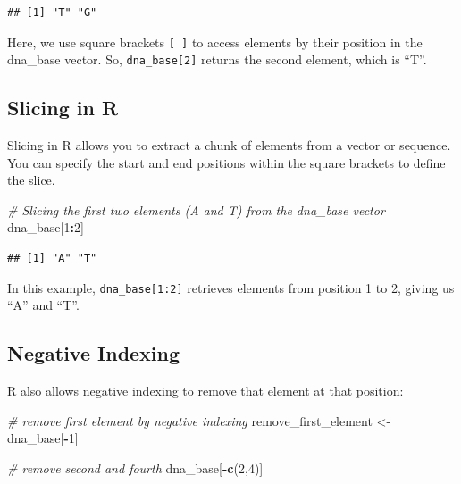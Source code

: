 \documentclass[
]{book}
\newenvironment{Shaded}{\begin{snugshade}}{\end{snugshade}}
\newcommand{\CommentTok}[1]{\textcolor[rgb]{0.56,0.35,0.01}{\textit{#1}}}
\newcommand{\DecValTok}[1]{\textcolor[rgb]{0.00,0.00,0.81}{#1}}
\newcommand{\FunctionTok}[1]{\textcolor[rgb]{0.13,0.29,0.53}{\textbf{#1}}}
\newcommand{\NormalTok}[1]{#1}
\newcommand{\OtherTok}[1]{\textcolor[rgb]{0.56,0.35,0.01}{#1}}
\newcommand{\SpecialCharTok}[1]{\textcolor[rgb]{0.81,0.36,0.00}{\textbf{#1}}}
\begin{document}
\begin{verbatim}
## [1] "T" "G"
\end{verbatim}

Here, we use square brackets \texttt{{[}\ {]}} to access elements by their position in the dna\_base vector. So, \texttt{dna\_base{[}2{]}} returns the second element, which is ``T''.

\hypertarget{slicing-in-r}{%
\subsection{Slicing in R}\label{slicing-in-r}}

Slicing in R allows you to extract a chunk of elements from a vector or sequence. You can specify the start and end positions within the square brackets to define the slice.

\begin{Shaded}
\begin{Highlighting}[]
\CommentTok{\# Slicing the first two elements (A and T) from the dna\_base vector}
\NormalTok{dna\_base[}\DecValTok{1}\SpecialCharTok{:}\DecValTok{2}\NormalTok{]}
\end{Highlighting}
\end{Shaded}

\begin{verbatim}
## [1] "A" "T"
\end{verbatim}

In this example, \texttt{dna\_base{[}1:2{]}} retrieves elements from position 1 to 2, giving us ``A'' and ``T''.

\hypertarget{negative-indexing}{%
\subsection{Negative Indexing}\label{negative-indexing}}

R also allows negative indexing to remove that element at that position:

\begin{Shaded}
\begin{Highlighting}[]
\CommentTok{\# remove first element by negative indexing}
\NormalTok{remove\_first\_element }\OtherTok{\textless{}{-}}\NormalTok{ dna\_base[}\SpecialCharTok{{-}}\DecValTok{1}\NormalTok{]}
\end{Highlighting}
\end{Shaded}

\begin{Shaded}
\begin{Highlighting}[]
\CommentTok{\# remove second and fourth}
\NormalTok{dna\_base[}\SpecialCharTok{{-}}\FunctionTok{c}\NormalTok{(}\DecValTok{2}\NormalTok{,}\DecValTok{4}\NormalTok{)]}
\end{Highlighting}
\end{Shaded}
\end{document}
